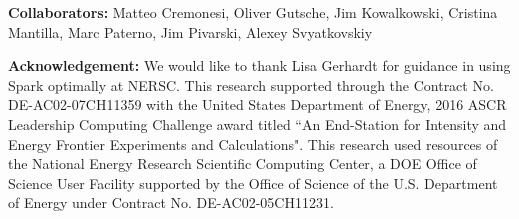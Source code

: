 \documentclass[11pt, twocolumn]{article}
\begin{document}
\textbf{Collaborators: } 
Matteo Cremonesi, Oliver Gutsche, Jim Kowalkowski, 
Cristina Mantilla, Marc Paterno, Jim Pivarski, Alexey Svyatkovskiy

\textbf{Acknowledgement: }
We would like to thank Lisa Gerhardt for guidance in using Spark optimally at NERSC. 
This research supported through the  Contract No. DE-AC02-07CH11359 with the United States Department of Energy, 2016 ASCR Leadership Computing Challenge award titled ``An End-Station for Intensity and Energy Frontier Experiments and Calculations". This research used resources of the National Energy Research Scientific Computing Center, a DOE Office of Science User Facility supported by the Office of Science of the U.S. Department of Energy under Contract No. DE-AC02-05CH11231.
\scriptsize


\end{document}

